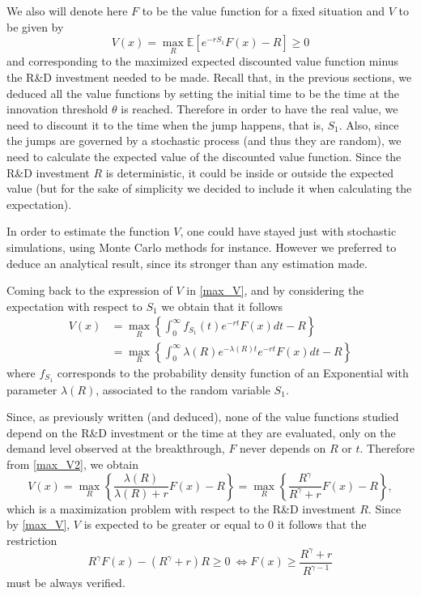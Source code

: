 We also will denote here $F$ to be the value function for a fixed situation and $V$ to be given by
\begin{equation}
	V(x)=\max_R \mathds{E} [ e^{-rS_1}F(x)-R]\geq 0
	\label{max_V}
\end{equation}
and corresponding to the maximized expected discounted value function minus the R\&D investment needed to be made. Recall that, in the previous sections, we deduced all the value functions by setting the initial time to be the time at the innovation threshold $\theta$ is reached. Therefore in order to have the real value, we need to discount it to the time when the jump happens, that is, $S_1$. Also, since the jumps are governed by a stochastic process (and thus they are random), we need to calculate the expected value of the discounted value function. Since the R\&D investment $R$ is deterministic, it could be inside or outside the expected value (but for the sake of simplicity we decided to include it when calculating the expectation).

In order to estimate the function $V$, one could have stayed just with stochastic simulations, using Monte Carlo methods for instance. However we preferred to deduce an analytical result, since its stronger than any estimation made. 

Coming back to the expression of $V$ in \eqref{max_V}, and by considering the expectation with respect to $S_1$ we obtain that it follows
\begin{align}
 V(x)&=\max_R  \left\{ \int_0 ^\infty f_{S_1}(t) e^{-rt} F(x) dt -R \right\} \nonumber \\
 &=\max_R  \left\{ \int_0 ^\infty \lambda(R) e^{-\lambda(R)t} e^{-rt} F(x) dt -R \right\} \label{max_V2}
\end{align}
where $f_{S_1}$ corresponds to the probability density function of an Exponential with parameter $\lambda(R)$, associated to the random variable $S_1$.

Since, as previously written (and deduced), none of the value functions studied depend on the R\&D investment or the time at they are evaluated, only on the demand level observed at the breakthrough, $F$ never depends on $R$ or $t$. Therefore from \eqref{max_V2}, we obtain
\begin{equation}
V(x)=\max_R \left\{ \frac{\lambda(R)}{\lambda(R)+r} F(x) -R \right\}=\max_R \left\{ \frac{R^\gamma}{R^\gamma+r} F(x) -R \right\},
\label{max_V3}
\end{equation}
which is a maximization problem with respect to the R\&D investment $R$. Since by \eqref{max_V}, $V$ is expected to be greater or equal to 0 it follows that the restriction
\begin{equation}
R^\gamma F(x) - (R^\gamma+r)R \geq 0 \ \Leftrightarrow  F(x) \geq \frac{R^\gamma+r}{R^{\gamma-1}}
	\label{max_rest}
\end{equation}
must be always verified.


